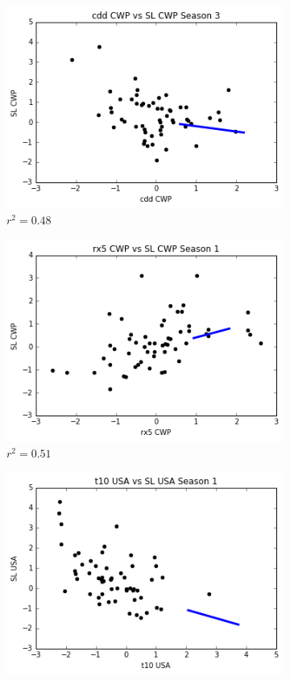 \documentclass[12pt]{report}
\begin{document}
	\begin{figure}[ht]
\centering 
\begin{subfigure}{.5\textwidth}
\centering
\includegraphics[scale = .5]{CDDLinearMaxS3CWP048.png}
\caption{$r^2 = 0.48$}
\label{fig:LinearMaxCDD}
\end{subfigure}%
\begin{subfigure}{.5\textwidth}
\centering
\includegraphics[scale = .5]{RX5LinearMaxS1CWP051.png}
\caption{$r^2 = 0.51$}
\label{fig:LinearMaxRX5}
\end{subfigure}
\begin{subfigure}{.5\textwidth}
\centering
\includegraphics[scale = .5]{T10LinearMaxS1USA072.png}

\end{subfigure}
\end{figure}
\end{document}
